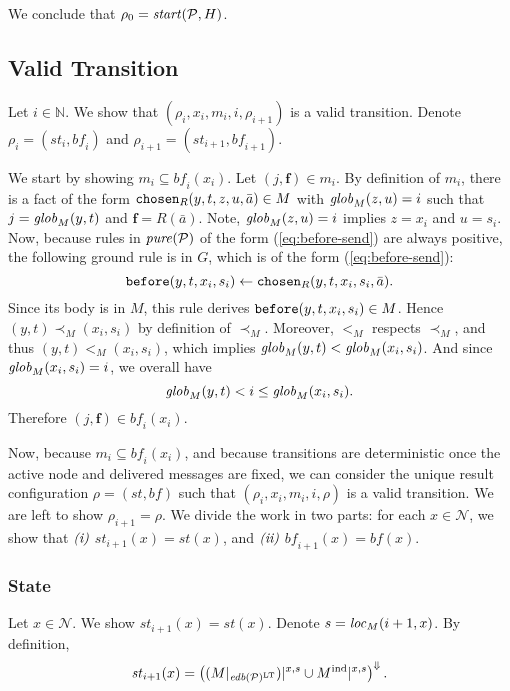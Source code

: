 \documentclass{tlp}
\newcommand{\Nat}{\mathbb{N}}  \newcommand{\len}[1]{|#1|} \newcommand{\rom}[1]{\text{\emph{(#1)}}} \newcommand{\romI}{\rom i}
\newcommand{\romII}{\rom{ii}}
\newcommand{\ded}{\mathcal{P}}
\newcommand{\fc}{\boldsymbol{f}}
\newcommand{\proj}[2]{#1|_{#2}}
\newcommand{\edb}[1]{\fname{edb}(#1)}
\newcommand{\nw}{\mathcal{N}}
\newcommand{\sh}[1]{(#1)}
\newcommand{\toloct}[1]{#1^{\mathrm{LT}}}
\newcommand{\projlt}[3]{#1|^{#2,#3}}
\newcommand{\shprojlt}[3]{\projlt{\sh{#1}}{#2}{#3}}
\newcommand{\droplt}[1]{#1^{\Downarrow}}
\newcommand{\before}{\pred{before}}
\newcommand{\chosen}{\pred{chosen}}
\newcommand{\pure}[1]{\fname{pure}(#1)}
\newcommand{\cnf}{\rho}
\newcommand{\cnfstart}[2]{\fname{\fname{start}}(#1,#2)}
\newcommand{\cnfs}{\mathit{st}}
\newcommand{\cnfb}{\mathit{bf}}
\newcommand{\pair}[2]{(#1,#2)}
\newcommand{\grded}{G}
\newcommand{\cauM}{\prec_{M}}
\newcommand{\totM}{<_{M}}
\newcommand{\globM}[1]{\fname{glob}_{M}(#1)}
\newcommand{\locM}[1]{\fname{loc}_{M}(#1)}
\newcommand{\Mind}{M^{\mathrm{ind}}}
\begin{document}
\begin{appendix}
We conclude that $\cnf_{0}=\cnfstart{\ded}H$.


\subsection{Valid Transition}

\label{sub:model-to-run--valid-transition}

Let $i\in\Nat$. We show that $(\cnf_{i},x_{i},m_{i},i,\cnf_{i+1})$
is a valid transition. Denote $\cnf_{i}=(\cnfs_{i},\cnfb_{i})$ and
$\cnf_{i+1}=(\cnfs_{i+1},\cnfb_{i+1})$.

We start by showing $m_{i}\subseteq\cnfb_{i}(x_{i})$. Let $\pair j{\fc}\in m_{i}$.
By definition of $m_{i}$, there is a fact of the form $\chosen_{R}(y,t,z,u,\bar{a})\in M$
with $\globM{z,u}=i$ such that $j=\globM{y,t}$ and $\fc=R(\bar{a})$.
Note, $\globM{z,u}=i$ implies $z=x_{i}$ and $u=s_{i}$. Now, because
rules in $\pure{\ded}$ of the form (\ref{eq:before-send}) are always
positive, the following ground rule is in $\grded$, which is of the
form (\ref{eq:before-send}): 
\[
\before(y,t,x_{i},s_{i})\gets\chosen_{R}(y,t,x_{i},s_{i},\bar{a}).
\]
Since its body is in $M$, this rule derives $\before(y,t,x_{i},s_{i})\in M$.
Hence $(y,t)\cauM(x_{i},s_{i})$ by definition of $\cauM$. Moreover,
$\totM$ respects $\cauM$, and thus $(y,t)\totM(x_{i},s_{i})$, which
implies $\globM{y,t}<\globM{x_{i},s_{i}}$. And since $\globM{x_{i},s_{i}}=i$,
we overall have 
\[
\globM{y,t}<i\leq\globM{x_{i},s_{i}}.
\]
Therefore $\pair j{\fc}\in\cnfb_{i}(x_{i})$. 

Now, because $m_{i}\subseteq\cnfb_{i}(x_{i})$, and because transitions
are deterministic once the active node and delivered messages are
fixed, we can consider the unique result configuration $\cnf=(\cnfs,\cnfb)$
such that $(\cnf_{i},x_{i},m_{i},i,\cnf)$ is a valid transition.
We are left to show $\cnf_{i+1}=\cnf$. We divide the work in two
parts: for each $x\in\nw$, we show that $\romI$ $\cnfs_{i+1}(x)=\cnfs(x)$,
and $\romII$ $\cnfb_{i+1}(x)=\cnfb(x)$. 


\subsubsection{State}

Let $x\in\nw$. We show $\cnfs_{i+1}(x)=\cnfs(x)$. Denote $s=\locM{i+1,x}$.
By definition, 
\[
\cnfs_{i+1}(x)=\droplt{\left(\shprojlt{\proj M{\toloct{\edb{\ded}}}}xs\cup\projlt{\Mind}xs\right)}.
\]




\end{appendix}
\end{document}
